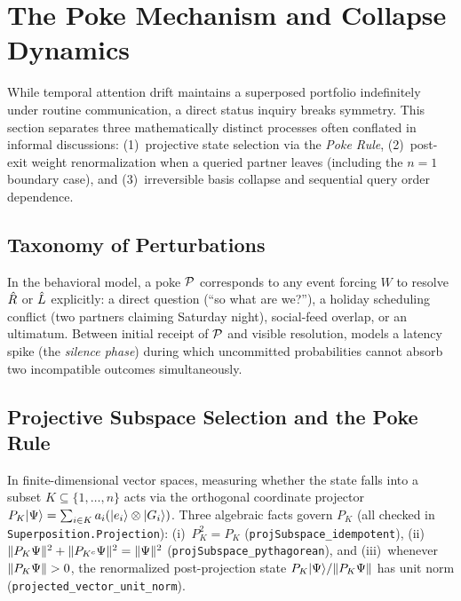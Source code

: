\section{The Poke Mechanism and Collapse Dynamics}
\label{sec:poke}

While temporal attention drift maintains a superposed portfolio indefinitely under routine
communication, a direct status inquiry breaks symmetry. This section separates three
mathematically distinct processes often conflated in informal discussions: (1)~projective
state selection via the \emph{Poke Rule}, (2)~post-exit weight renormalization when a queried
partner leaves (including the $n = 1$ boundary case), and (3)~irreversible basis collapse and
sequential query order dependence.

\subsection{Taxonomy of Perturbations}
\label{subsec:poke-taxonomy}

\noindent\layerbehav{} In the behavioral model, a poke $\mathcal{P}$ corresponds to any event
forcing $W$ to resolve $\hat{R}$ or $\hat{L}$ explicitly: a direct question (``so what are we?''),
a holiday scheduling conflict (two partners claiming Saturday night), social-feed overlap, or
an ultimatum. Between initial receipt of $\mathcal{P}$ and visible resolution, \RST{} models a
latency spike (the \emph{silence phase}) during which uncommitted probabilities cannot absorb
two incompatible outcomes simultaneously.

\subsection{Projective Subspace Selection and the Poke Rule}
\label{subsec:poke-rule}

\noindent\layermath{} In finite-dimensional vector spaces, measuring whether the state falls
into a subset $K \subseteq \{1, \dots, n\}$ acts via the orthogonal coordinate projector
$P_K \lvert \Psi \rangle = \sum_{i \in K} a_i (\lvert e_i \rangle \otimes \lvert G_i \rangle)$. Three algebraic facts
govern $P_K$ (all checked in \texttt{Superposition.\allowbreak{}Projection}):
(i)~$P_K^2 = P_K$ (\texttt{projSubspace\_\allowbreak{}idempotent}),
(ii)~$\lVert P_K \Psi \rVert^2 + \lVert P_{K^c} \Psi \rVert^2 = \lVert \Psi \rVert^2$
(\texttt{projSubspace\_\allowbreak{}pythagorean}), and (iii)~whenever $\lVert P_K \Psi \rVert > 0$,
the renormalized post-projection state $P_K \lvert \Psi \rangle / \lVert P_K \Psi \rVert$ has unit norm
(\texttt{projected\_vector\_\allowbreak{}unit\_norm}).

